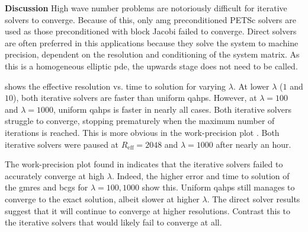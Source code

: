 {\bf Discussion}
High wave number problems are notoriously difficult for iterative solvers to converge. Because of this, only \gls{amg} preconditioned PETSc solvers are used as those preconditioned with block Jacobi failed to converge. Direct solvers are often preferred in this applications because they solve the system to machine precision, dependent on the resolution and conditioning of the system matrix. As this is a homogeneous elliptic \gls{pde}, the upwards stage does not need to be called.

 shows the effective resolution vs. time to solution for varying $\lambda$. At lower $\lambda$ ($1$ and $10$), both iterative solvers are faster than uniform \gls{qahps}. However, at $\lambda = 100$ and $\lambda = 1000$, uniform \gls{qahps} is faster in nearly all cases. Both iterative solvers struggle to converge, stopping prematurely when the maximum number of iterations is reached. This is more obvious in the work-precision plot . Both iterative solvers were paused at $R_{\text{eff}} = 2048$ and $\lambda = 1000$ after nearly an hour.

The work-precision plot found in  indicates that the iterative solvers failed to accurately converge at high $\lambda$. Indeed, the higher error and time to solution of the \gls{gmres} and \gls{bcgs} for $\lambda = 100, 1000$ show this. Uniform \gls{qahps} still manages to converge to the exact solution, albeit slower at higher $\lambda$. The direct solver results suggest that it will continue to converge at higher resolutions. Contrast this to the iterative solvers that would likely fail to converge at all.